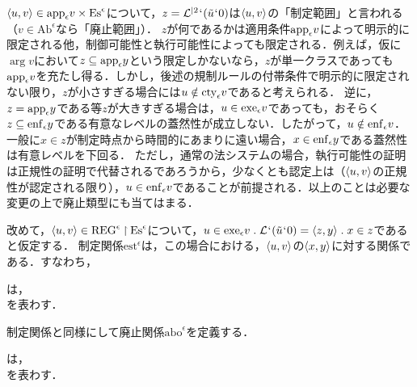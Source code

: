 $\langle u,v \rangle\in\mathrm{app}_{\epsilon}v\times\mathrm{Es}^{\epsilon}$について，$ z = \mathcal{L}^{\mid 2}{\mspace{1mu}{`}\mspace{1mu}}(\tilde{u}{\mspace{1mu}{`}\mspace{1mu}} 0)$は$\langle u,v \rangle$の「制定範囲」と言われる（$v\in\mathrm{Ab}^{\epsilon}$なら「廃止範囲」）．
$z$が何であるかは適用条件$ \mathrm{app}_{\epsilon} v $によって明示的に限定される他，制御可能性と執行可能性によっても限定される．例えば，仮に$\arg v$において$ z\subseteq\mathrm{app}_{\epsilon}y $という限定しかないなら，$z$が単一クラスであっても$\mathrm{app}_{\epsilon}v$を充たし得る．しかし，後述の規制ルールの付帯条件で明示的に限定されない限り，$z$が小さすぎる場合には$ u\notin\mathrm{cty}_{\epsilon}v $であると考えられる．
逆に，$ z = \mathrm{app}_{\epsilon} y $である等$z$が大きすぎる場合は，$u\in\mathrm{exe}_{\epsilon} v$であっても，おそらく$ z\subseteq\mathrm{enf}_{\epsilon}y $である有意なレベルの蓋然性が成立しない．したがって，$ u\notin\mathrm{enf}_{\epsilon}v $．一般に$x\in z$が制定時点から時間的にあまりに遠い場合，$x\in\mathrm{enf}_{\epsilon}y$である蓋然性は有意レベルを下回る．
ただし，通常の法システムの場合，執行可能性の証明は正規性の証明で代替されるであろうから，少なくとも認定上は（$ \langle u,v \rangle $の正規性が認定される限り），$ u\in\mathrm{enf}_{\epsilon}v $であることが前提される．以上のことは必要な変更の上で廃止類型にも当てはまる．

改めて，$ \langle u,v \rangle\in\mathrm{REG}^\epsilon\mathbin{\upharpoonright}\mathrm{Es}^\epsilon $について，$ u\in\exe{\epsilon} v\con{1}\mathcal{L}\fap(\tilde{u}\fap 0) = \orp{z,y}\con{1}x\in z $であると仮定する．
制定関係$ \mathrm{est}^\epsilon $は，この場合における，$ \langle u,v \rangle $の$ \langle x,y \rangle $に対する関係である．すなわち，

\begin{df}
\label{df:制定関係}
は，\\\hfill
{}を表わす．
\end{df}

\noindent 制定関係と同様にして廃止関係$\mathrm{abo}^\epsilon$を定義する．

\begin{df}
\label{df:廃止関係}
は，\\\hfill
{}を表わす．
\end{df}


